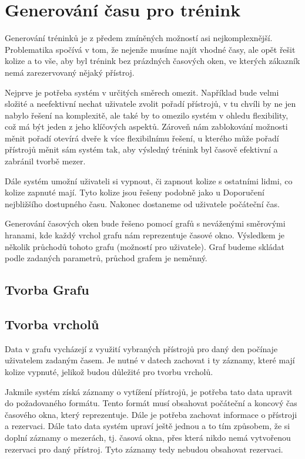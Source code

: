 \section{Generování času pro trénink}
Generování tréninků je z předem zmíněných možností asi nejkomplexnější. Problematika spočívá v tom, že nejenže musíme najít vhodné časy, ale opět řešit kolize a to vše, aby byl trénink bez prázdných časových oken, ve kterých zákazník nemá zarezervovaný nějaký přístroj. 

Nejprve je potřeba systém v určitých směrech omezit. Například bude velmi složité a neefektivní nechat uživatele zvolit pořadí přístrojů, v tu chvíli by ne jen nabylo řešení na komplexitě, ale také by to omezilo systém v ohledu flexibility, což má být jeden z jeho klíčových aspektů. Zároveň nám zablokování možnosti měnit pořadí otevírá dveře k více flexibilnímu řešení, u kterého může pořadí přístrojů měnit sám systém tak, aby výsledný trénink byl časově efektivní a zabránil tvorbě mezer.

Dále systém umožní uživateli si vypnout, či zapnout kolize s ostatními lidmi, co kolize zapnuté mají. Tyto kolize jsou řešeny podobně jako u Doporučení nejbližšího dostupného času. Nakonec dostaneme od uživatele počáteční čas. 

Generování časových oken bude řešeno pomocí grafů s neváženými směrovými hranami, kde každý vrchol grafu nám reprezentuje časové okno. Výsledkem je několik průchodů tohoto grafu (možností pro uživatele). Graf budeme skládat podle zadaných parametrů, průchod grafem je neměnný. 
\subsection{Tvorba Grafu}

\subsection{Tvorba vrcholů}
Data v grafu vycházejí z využití vybraných přístrojů pro daný den počínaje uživatelem zadaným časem. Je nutné v datech zachovat i ty záznamy, které mají kolize vypnuté, jelikož budou důležité pro tvorbu vrcholů.

Jakmile systém získá záznamy o vytížení přístrojů, je potřeba tato data upravit do požadovaného formátu. Tento formát musí obsahovat počáteční a koncový čas časového okna, který reprezentuje. Dále je potřeba  zachovat informace o přístroji a rezervaci. Dále tato data systém upraví ještě jednou a to tím způsobem, že si doplní záznamy o mezerách, tj. časová okna, přes která nikdo nemá vytvořenou rezervaci pro daný přístroj. Tyto záznamy tedy nebudou obsahovat rezervaci. 

